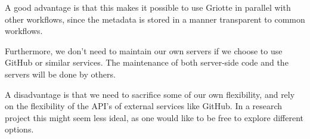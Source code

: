 \documentclass[conference,a4paper]{IEEEtran}
\begin{document}
A good advantage is that this makes it possible to use Griotte in
parallel with other workflows, since the metadata is stored in a
manner transparent to common workflows.

Furthermore, we don't need to maintain our own servers if we choose to
use GitHub or similar services. The maintenance of both server-side
code and the servers will be done by others.

A disadvantage is that we need to sacrifice some of our own
flexibility, and rely on the flexibility of the API's of external
services like GitHub. In a research project this might seem less
ideal, as one would like to be free to explore different
options.

\end{document}
